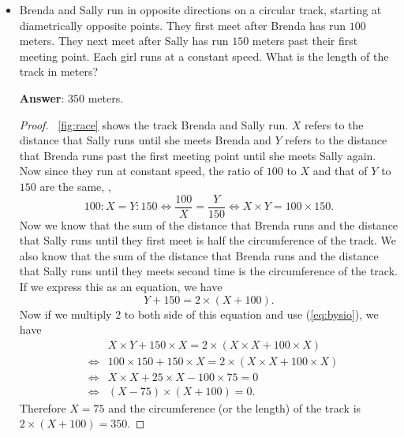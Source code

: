 \documentclass{article}
\begin{document}
\begin{itemize}
\begin{proof}
Now we subtract (\ref{eq:uydh}) from (\ref{eq:oges}), we get
\begin{equation}
x = (3\times x + 3\times y) - (2 \times x + 3 \times) =  3 \times 18 - 42 = 54 - 42 = 12.
\end{equation}
Since we initially assumed that $x$ is the number of $2$-headed dragons,
the answer is $12$.
\end{proof}


\item Brenda and Sally run in opposite directions on a circular track,
starting at diametrically opposite points.
They first meet after Brenda has run $100$ meters.
They next meet after Sally has run $150$ meters past their first meeting point.
Each girl runs at a constant speed.
What is the length of the track in meters?

{\bf Answer}: $350$ meters.

\begin{proof}
\figurename~\ref{fig:race} shows the track Brenda and Sally run.
$X$ refers to the distance that Sally runs until she meets Brenda
and $Y$ refers to the distance that Brenda runs past the first meeting point until she meets Sally again.
Now since they run at constant speed,
the ratio of $100$ to $X$ and that of $Y$ to $150$ are the same,
\ie,
\begin{equation}
\label{eq:bysio}
100 : X = Y : 150
\Leftrightarrow
\frac{100}{X} = \frac{Y}{150}
\Leftrightarrow
X \times Y = 100 \times 150.
\end{equation}
Now we know that the sum of the distance that Brenda runs and the distance that Sally runs until they first meet
is half the circumference of the track.
We also know that the sum of the distance that Brenda runs and the distance that Sally runs
until they meets second time is the circumference of the track.
If we express this as an equation, we have
\begin{equation}
Y + 150 = 2 \times (X + 100).
\end{equation}
Now if we multiply $2$ to both side of this equation and use (\ref{eq:bysio}),
we have
\begin{eqnarray*}
&& X \times Y + 150 \times X = 2 \times (X \times X + 100 \times X)
\\
&\Leftrightarrow&
100 \times 150 + 150 \times X = 2 \times (X \times X + 100 \times X)
\\
&\Leftrightarrow&
X\times X + 25 \times X  - 100 \times 75 = 0
\\
&\Leftrightarrow&
(X - 75) \times (X + 100) = 0.
\end{eqnarray*}
Therefore $X=75$ and the circumference (or the length) of the track
is $2\times (X+100) = 350$.


\end{proof}
\end{itemize}
\end{document}
